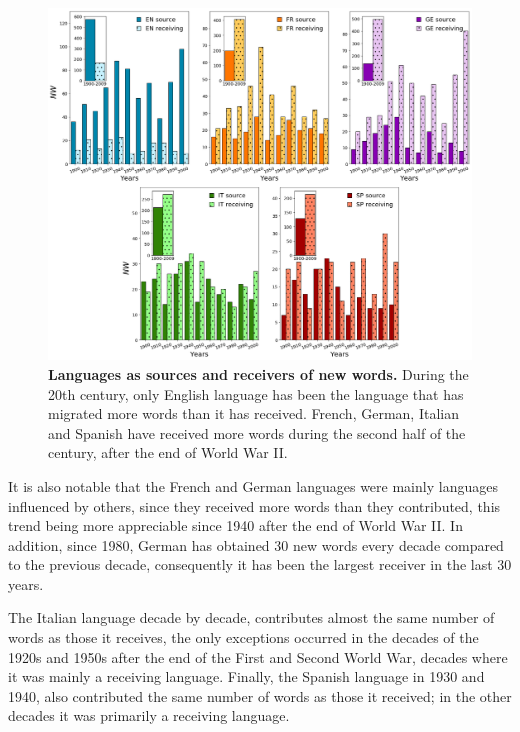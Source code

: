 \documentclass[10pt,letterpaper]{article} %
\begin{document}
\begin{figure}[!h]
	\begin{adjustwidth}{-1.2in}{0in}
	\includegraphics[scale=.35]{NW_OR.png}
	\caption{{\bf Languages ​​as sources and receivers of new words.} During the 20th century, only English language has been the language that has migrated more words than it has received. French, German, Italian and Spanish have received more words during the second half of the century, after the end of World War II.}
	\label{fig.NMW_OR}
	\end{adjustwidth}
\end{figure}

It is also notable that the French and German languages ​​were mainly languages ​​influenced by others, since they received more words than they contributed, this trend being more appreciable since 1940 after the end of World War II. In addition, since 1980, German has obtained 30 new words every decade compared to the previous decade, consequently it has been the largest receiver in the last 30 years.

The Italian language decade by decade, contributes almost the same number of words as those it receives, the only exceptions occurred in the decades of the 1920s and 1950s after the end of the First and Second World War, decades where it was mainly a receiving language. Finally, the Spanish language in 1930 and 1940, also contributed the same number of words as those it received; in the other decades it was primarily a receiving language.
\end{document}
